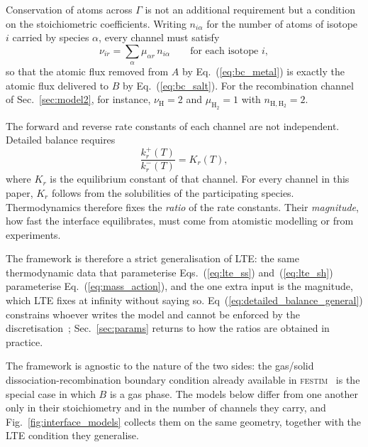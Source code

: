 \documentclass[5p]{elsarticle}
\newcommand{\FESTIM}{\textsc{festim}}
\begin{document}
Conservation of atoms across $\Gamma$ is not an additional requirement but a condition on the stoichiometric coefficients.
Writing $n_{i\alpha}$ for the number of atoms of isotope $i$ carried by species $\alpha$, every channel must satisfy
\begin{equation}
    \nu_{ir} = \sum_\alpha \mu_{\alpha r}\, n_{i\alpha}
    \qquad \text{for each isotope } i,
    \label{eq:atom_balance}
\end{equation}
so that the atomic flux removed from $A$ by Eq.~(\ref{eq:bc_metal}) is exactly the atomic flux delivered to $B$ by Eq.~(\ref{eq:bc_salt}). 
For the recombination channel of Sec.~\ref{sec:model2}, for instance,
$\nu_\mathrm{H} = 2$ and $\mu_{\mathrm{H_2}} = 1$ with $n_{\mathrm{H,H_2}} = 2$.

The forward and reverse rate constants of each channel are not independent.
Detailed balance requires
\begin{equation}
    \frac{k_r^{+}(T)}{k_r^{-}(T)} = K_r(T),
    \label{eq:detailed_balance_general}
\end{equation}
where $K_r$ is the equilibrium constant of that channel.
For every channel in this paper, $K_r$ follows from the solubilities of the participating species.
Thermodynamics therefore fixes the \emph{ratio} of the rate constants.
Their \emph{magnitude}, how fast the interface equilibrates, must come from atomistic modelling or from experiments.

The framework is therefore a strict generalisation of LTE: the same thermodynamic data that parameterise Eqs.~(\ref{eq:lte_ss}) and~(\ref{eq:lte_sh}) parameterise Eq.~(\ref{eq:mass_action}), and the one extra input is the magnitude, which LTE fixes at infinity without saying so.
Eq~(\ref{eq:detailed_balance_general}) constrains whoever writes the model and cannot be enforced by the discretisation~\cite{mhadeshwar_thermodynamic_2003, mhadeshwar_thermodynamically_2005, gorban_extended_2011}; Sec.~\ref{sec:params} returns to how the ratios are obtained in practice.

The framework is agnostic to the nature of the two sides: the gas/solid
dissociation-recombination boundary condition already available in \FESTIM{}~\cite{ali-khan_rate_1978, pick_model_1985, hodille_kinetic_2020, kulagin_kinetic_2024} is the special case in which $B$ is a gas phase.
The models below differ from one another only in their stoichiometry and in the number of channels they carry, and Fig.~\ref{fig:interface_models} collects them on the same geometry, together with the LTE condition they generalise.
\end{document}
